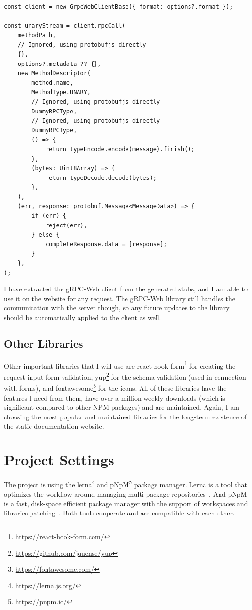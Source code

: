 \begin{lstlisting}[style=JavaScript, caption={gRPC-Web extracted client unary call example}, label={lst:grpc-web-client}]
const client = new GrpcWebClientBase({ format: options?.format });

const unaryStream = client.rpcCall(
    methodPath,
    // Ignored, using protobufjs directly
    {},
    options?.metadata ?? {},
    new MethodDescriptor(
        method.name,
        MethodType.UNARY,
        // Ignored, using protobufjs directly
        DummyRPCType,
        // Ignored, using protobufjs directly
        DummyRPCType,
        () => {
            return typeEncode.encode(message).finish();
        },
        (bytes: Uint8Array) => {
            return typeDecode.decode(bytes);
        },
    ),
    (err, response: protobuf.Message<MessageData>) => {
        if (err) {
            reject(err);
        } else {
            completeResponse.data = [response];
        }
    },
);
\end{lstlisting}


I have extracted the gRPC-Web client from the generated stubs, and I am able to use it on the website for any request.
The gRPC-Web library still handles the communication with the server though, so any future updates to the library should be automatically applied to the client as well.

\subsection{Other Libraries}
Other important libraries that I will use are react-hook-form\footnote{\url{https://react-hook-form.com/}} for creating the request input form validation, yup\footnote{\url{https://github.com/jquense/yup}} for the schema validation (used in connection with forms), and fontawesome\footnote{\url{https://fontawesome.com/}} for the icons.
All of these libraries have the features I need from them, have over a million weekly downloads (which is significant compared to other NPM packages) and are maintained.
Again, I am choosing the most popular and maintained libraries for the long-term existence of the static documentation website.


\section{Project Settings}
The project is using the lerna\footnote{\url{https://lerna.js.org/}} and pNpM\footnote{\url{https://pnpm.io/}} package manager.
Lerna is a tool that optimizes the workflow around managing multi-package repositories~\cite{lerna}.
And pNpM is a fast, disk-space efficient package manager with the support of workspaces and libraries patching~\cite{pnpm}.
Both tools cooperate and are compatible with each other.

